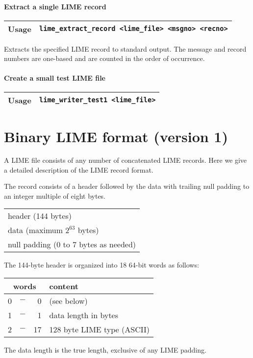 \documentclass{article}
\begin{document}
\paragraph{Extract a single LIME record}
%
\begin{flushleft}
  \begin{tabular}{|l|l|}
  \hline
  Usage     & \verb|lime_extract_record <lime_file> <msgno> <recno>| \\
  \hline
 \end{tabular}
\end{flushleft}
%
Extracts the specified LIME record to standard output.  The message
and record numbers are one-based and are counted in the order of
occurrence.

\paragraph{Create a small test LIME file}
%
\begin{flushleft}
  \begin{tabular}{|l|l|}
  \hline
  Usage     & \verb|lime_writer_test1 <lime_file>| \\
  \hline
 \end{tabular}
\end{flushleft}
%

\appendix
\section{Binary LIME format (version 1)}

A LIME file consists of any number of concatenated LIME records.  Here
we give a detailed description of the LIME record format.

The record consists of a header followed by the data with trailing
null padding to an integer multiple of eight bytes.

\begin{center}
  \begin{tabular}{|l|}
  \hline
   header (144 bytes) \\
   data (maximum $2^{63}$ bytes) \\
   null padding (0 to 7 bytes as needed) \\
  \hline
  \end{tabular}
\end{center}

The 144-byte header is organized into 18 64-bit words as follows:

\begin{center}
  \begin{tabular}{|rcr|l|}
    \hline
    \multicolumn{3}{|c|}{words} & content \\
    \hline
    0 & $-$ &  0  & (see below) \\
    1 & $-$ &  1  & data length in bytes \\
    2 & $-$ & 17  & 128 byte LIME type (ASCII) \\
    \hline
  \end{tabular}
\end{center}
%
The data length is the true length, exclusive of any LIME padding.
\end{document}
